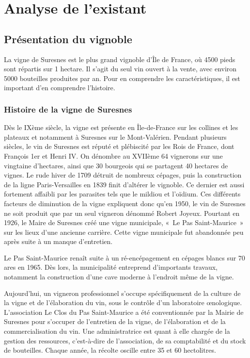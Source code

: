 \documentclass[a4paper, title]{report}
\begin{document}
\newpage
\tableofcontents
\newpage
\listoffigures
\newpage

\chapter{Analyse de l'existant}\label{analyse-de-lexistant}

\section{Présentation du
vignoble}\label{presentation-du-vignoble}

La vigne de Suresnes est le plus grand vignoble d'Île de France, où 4500
pieds sont répartis sur 1 hectare. Il s'agit du seul vin ouvert à la
vente, avec environ 5000 bouteilles produites par an. Pour en comprendre
les caractéristiques, il est important d'en comprendre l'histoire.

\subsection{Histoire de la vigne de
Suresnes}\label{histoire-de-la-vigne-de-suresnes}

Dès le IXème siècle, la vigne est présente en Île-de-France sur les
collines et les plateaux et notamment à Suresnes sur le Mont-Valérien.
Pendant plusieurs siècles, le vin de Suresnes est réputé et plébiscité
par les Rois de France, dont François 1er et Henri IV. On dénombre au
XVIIème 64 vignerons sur une vingtaine d'hectares, ainsi que 30
bourgeois qui se partagent 40 hectares de vignes. Le rude hiver de 1709
détruit de nombreux cépages, puis la construction de la ligne
Paris-Versailles en 1839 finit d'altérer le vignoble. Ce dernier est
aussi fortement affaibli par les parasites tels que le mildiou et
l'oïdium. Ces différents facteurs de diminution de la vigne expliquent
donc qu'en 1950, le vin de Suresnes ne soit produit que par un seul
vigneron dénommé Robert Joyeux. Pourtant en 1926, le Maire de Suresnes
créé une vigne municipale, «~Le Pas Saint-Maurice~» sur les lieux d'une
ancienne carrière. Cette vigne municipale fut abandonnée peu après suite
à un manque d'entretien.

Le Pas Saint-Maurice renaît suite à un ré-encépagement en cépages blancs
sur 70 ares en 1965. Dès lors, la municipalité entreprend d'importants
travaux, notamment la construction d'une cave moderne à l'endroit même
de la vigne.

Aujourd'hui, un vigneron professionnel s'occupe spécifiquement de la
culture de la vigne et de l'élaboration du vin, sous le contrôle d'un
laboratoire œnologique. L'association Le Clos du Pas Saint-Maurice a été
conventionnée par la Mairie de Suresnes pour s'occuper de l'entretien de
la vigne, de l'élaboration et de la commercialisation du vin. Une
administratrice est quant à elle chargée de la gestion des ressources,
c'est-à-dire de l'association, de sa comptabilité et du stock de
bouteilles. Chaque année, la récolte oscille entre 35 et 60 hectolitres.
\end{document}
